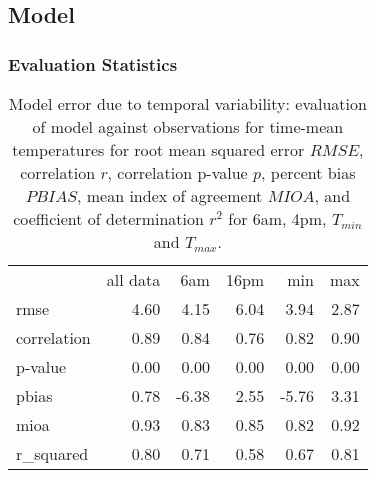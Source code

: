 \documentclass[draft,linenumbers]{agujournal}
\begin{document}
\subsection{Model}

\subsubsection{Evaluation Statistics}

\begin{table}
\centering
\begin{tabular}{lrrrrr}
{} &  all data &     6am &   16pm &   min &  max \\
rmse        &      4.60 &  4.15 & 6.04 &  3.94 & 2.87 \\
correlation &      0.89 &  0.84 & 0.76 &  0.82 & 0.90 \\
p-value     &      0.00 &  0.00 & 0.00 &  0.00 & 0.00 \\
pbias       &      0.78 & -6.38 & 2.55 & -5.76 & 3.31 \\
mioa        &      0.93 &  0.83 & 0.85 &  0.82 & 0.92 \\
r\_squared   &      0.80 &  0.71 & 0.58 &  0.67 & 0.81 \\
\end{tabular}
\caption{Model error due to temporal variability: evaluation of model against observations for time-mean temperatures for root mean squared error $RMSE$, correlation  $r$, correlation p-value $p$, percent bias $PBIAS$, mean index of agreement $MIOA$, and coefficient of determination $r^2$ for 6am, 4pm, $T_{min}$ and $T_{max}$.  }
\label{tab:time_error}
\end{table}
\end{document}
